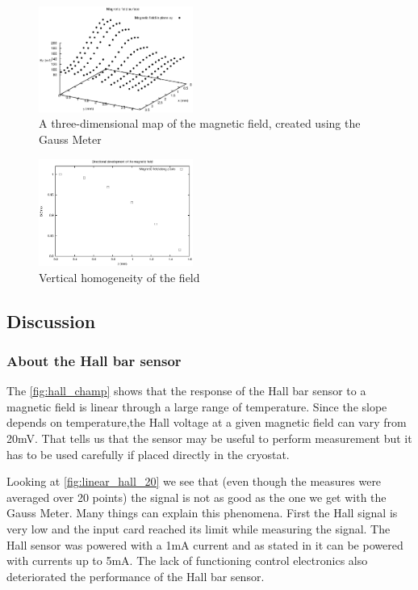 \documentclass[journal]{IEEEtran}
\begin{document}
\begin{figure}[h]
\centering
\includegraphics[width=0.45\textwidth]{cartographie_champ.eps}
\caption{A three-dimensional map of the magnetic field, created using the Gauss Meter}
\label{fig:map}
\end{figure}

\begin{figure}[h]
\centering
\includegraphics[width=0.45\textwidth]{cartographie_champ_z.eps}
\caption{Vertical homogeneity of the field}
\label{fig:homo_z}
\end{figure}

\subsection{Discussion}

\subsubsection{About the Hall bar sensor}

The \figurename \ref{fig:hall_champ} shows that the response of the Hall bar sensor to a magnetic field is linear through a large range of temperature. Since the slope depends on temperature,the Hall voltage at a given magnetic field can vary from 20mV. That tells us that the sensor may be useful to perform measurement but it has to be used carefully if placed directly in the cryostat.

Looking at \figurename \ref{fig:linear_hall_20} we see that (even though the measures were averaged over 20 points) the signal is not as good as the one we get with the Gauss Meter. Many things can explain this phenomena. First the Hall signal is very low and the input card reached its limit while measuring the signal. The Hall sensor was powered with a 1mA current and as stated in \cite{toshiba} it can be powered with currents up to 5mA. The lack of functioning control electronics also deteriorated the performance of the Hall bar sensor. 
\end{document}
